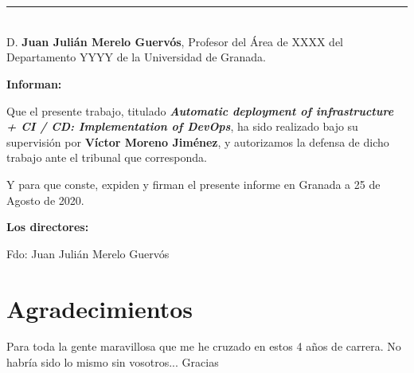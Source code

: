\chapter*{}
\thispagestyle{empty}

\noindent\rule[-1ex]{\textwidth}{2pt}\\[4.5ex]

D. \textbf{Juan Julián Merelo Guervós}, Profesor del Área de XXXX del Departamento YYYY de la Universidad de Granada.


\vspace{0.5cm}

\textbf{Informan:}

\vspace{0.5cm}

Que el presente trabajo, titulado \textit{\textbf{Automatic deployment of infrastructure + CI / CD: Implementation of DevOps}},
ha sido realizado bajo su supervisión por \textbf{Víctor Moreno Jiménez}, y autorizamos la defensa de dicho trabajo ante el tribunal
que corresponda.

\vspace{0.5cm}

Y para que conste, expiden y firman el presente informe en Granada a 25 de Agosto de 2020.

\vspace{1cm}

\textbf{Los directores:}

\vspace{5cm}
\noindent Fdo: Juan Julián Merelo Guervós



\chapter*{Agradecimientos}
\thispagestyle{empty}

       \vspace{1cm}


Para toda la gente maravillosa que me he cruzado en estos 4 años de carrera. No habría sido lo mismo sin vosotros... Gracias

